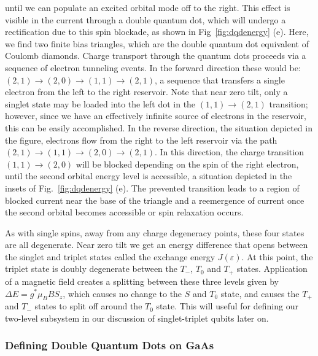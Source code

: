 until we can populate an excited orbital mode off to the right. This effect is visible in the current through a double
quantum dot, which will undergo a rectification due to this spin blockade, as shown in Fig~\ref{fig:dqdenergy} (e).
Here, we find two finite bias triangles, which are the double quantum dot equivalent of Coulomb diamonds\cite{PhysRevB.72.165308}.
Charge transport through the quantum dots proceeds via a sequence of electron tunneling events. In the forward direction
these would be: $(2, 1) \rightarrow (2, 0) \rightarrow (1, 1) \rightarrow (2, 1)$, a sequence that transfers a single electron
from the left to the right reservoir. Note that near zero tilt, only a singlet state may be loaded into the left dot
in the $(1, 1) \rightarrow (2, 1)$ transition; however, since we have an effectively infinite source of electrons in the
reservoir, this can be easily accomplished. In the reverse direction, the situation depicted in the figure, electrons flow
from the right to the left reservoir via the path $(2, 1) \rightarrow (1, 1) \rightarrow (2, 0) \rightarrow (2, 1)$.
In this direction, the charge transition $(1, 1) \rightarrow (2, 0)$ will be blocked depending on the spin of the right
electron, until the second orbital energy level is accessible, a situation depicted in the insets of Fig.~\ref{fig:dqdenergy} (e).
The prevented transition leads to a region of blocked current near the base of the triangle and a reemergence of current once the second orbital
becomes accessible or spin relaxation occurs.

As with single spins, away from any charge degeneracy points, these four states are all degenerate. Near zero tilt we get an
energy difference that opens between the singlet and triplet states called the exchange energy $J(\varepsilon)$. At this
point, the triplet state is doubly degenerate between the $T_-$, $T_0$ and $T_+$ states. Application of a magnetic field creates
a splitting between these three levels given by $\Delta E = g^* \mu_B B S_z$, which causes no change to the $S$ and $T_0$ state,
and causes the $T_+$ and $T_-$ states to split off around the $T_0$ state. This will useful for defining our two-level subsystem
in our discussion of singlet-triplet qubits later on.

\subsubsection{Defining Double Quantum Dots on GaAs}

